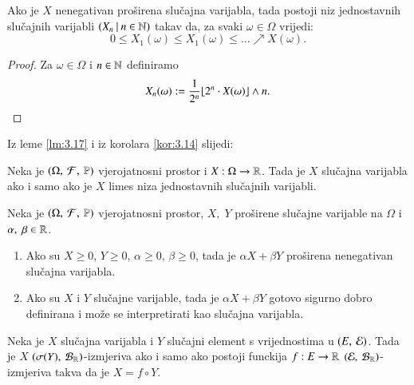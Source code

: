 \begin{lm}  \label{lm:3.17}
    Ako je $X$ nenegativan pro\v sirena slu\v cajna varijabla, tada postoji niz jednostavnih slu\v cajnih varijabli $({X_n} \: | \: {n \in \mathbb{N}})$ takav da, za svaki $\omega \in \Omega$ vrijedi:
    \begin{equation*}
        0 \leq X_1(\omega) \leq X_1(\omega) \leq  \dots \nearrow X(\omega).
    \end{equation*} 
\end{lm}

\begin{proof}
    Za $\omega \in \Omega$ i $n \in \mathbb{N}$ definiramo
    \begin{equation*}
        X_n(\omega) := \frac{1}{2^n} \floor*{2^n \cdot X(\omega)} \land n.
    \end{equation*}
\end{proof}

Iz leme \ref{lm:3.17} i iz korolara \ref{kor:3.14} slijedi:

\begin{tm}  \label{tm:3.18}
    Neka je $(\Omega, \: \mathcal{F}, \: \mathbb{P})$ vjerojatnosni prostor i $X: \Omega \to \mathbb{R}$. Tada je $X$ slu\v cajna varijabla ako i samo ako je $X$ limes niza jednostavnih slu\v cajnih varijabli.
\end{tm}

\begin{zad} \label{zad:3.19}
    Neka je $(\Omega, \: \mathcal{F}, \: \mathbb{P})$ vjerojatnosni prostor, $X, \; Y$ pro\v sirene slu\v cajne varijable na $\Omega$ i $\alpha, \; \beta \in \mathbb{R}$.
    \begin{enumerate}[label=(\alph*)]
        \item Ako su $X \geq 0$, $Y \geq 0$, $\alpha \geq 0$, $\beta    \geq 0$, tada je $\alpha X + \beta Y$ pro\v sirena nenegativan slu\v cajna varijabla.
        \item Ako su $X$ i $Y$ slu\v cajne  varijable, tada je $\alpha X + \beta Y$ gotovo sigurno dobro definirana i mo\v ze se interpretirati kao slu\v cajna varijabla.
    \end{enumerate}
\end{zad}

\begin{zad}
    Neka je $X$ slu\v cajna varijabla i $Y$ slu\v cajni element s vrijednostima u $(E, \: \mathcal{E})$.
    Tada je $X$ $(\sigma({Y}), \: \mathcal{B}_{\mathbb{R}})$-izmjeriva ako i samo ako postoji funckija $f: E \to \mathbb{R}$ $(\mathcal{E}, \: \mathcal{B}_{\mathbb{R}})$-izmjeriva takva da je $X = f \circ Y$.
\end{zad}

%
%